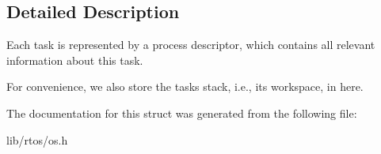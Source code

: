 \subsection{Detailed Description}
Each task is represented by a process descriptor, which contains all relevant information about this task. 

For convenience, we also store the task\textquotesingle{}s stack, i.\+e., its workspace, in here. 

The documentation for this struct was generated from the following file\+:\begin{DoxyCompactItemize}
\item 
lib/rtos/os.\+h\end{DoxyCompactItemize}
